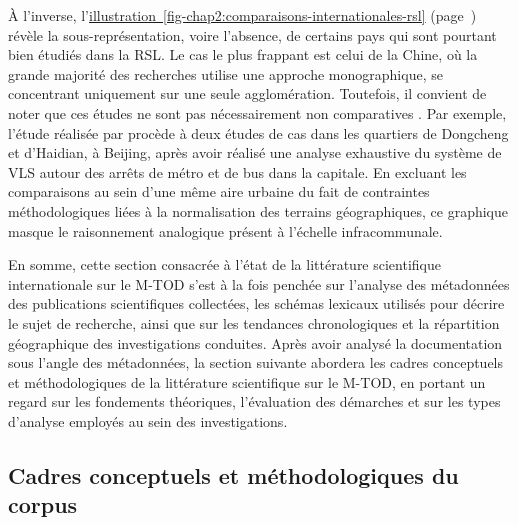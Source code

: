 \begin{refsegment}
À l'inverse, l'\hyperref[fig-chap2:comparaisons-internationales-rsl]{illustration~\ref{fig-chap2:comparaisons-internationales-rsl}} (page~\pageref{fig-chap2:comparaisons-internationales-rsl}) révèle la sous-représentation, voire l'absence, de certains pays qui sont pourtant bien étudiés dans la \acrshort{RSL}. Le cas le plus frappant est celui de la Chine, où la grande majorité des recherches utilise une approche monographique, se concentrant uniquement sur une seule agglomération. Toutefois, il convient de noter que ces études ne sont pas nécessairement non comparatives \textcolor{blue}{\autocite[30-31]{gueranger_monographie_2012}}. Par exemple, l'étude réalisée par \textcolor{blue}{\textcite[77]{liu_solving_2012}} procède à deux études de cas dans les quartiers de Dongcheng et d'Haidian, à Beijing, après avoir réalisé une analyse exhaustive du système de \acrshort{VLS} autour des arrêts de métro et de bus dans la capitale. En excluant les comparaisons au sein d'une même aire urbaine du fait de contraintes méthodologiques liées à la normalisation des terrains géographiques, ce graphique masque le raisonnement analogique présent à l'échelle infracommunale.%

En somme, cette section consacrée à l'état de la littérature scientifique internationale sur le \acrshort{M-TOD} s'est à la fois penchée sur l'analyse des métadonnées des publications scientifiques collectées, les schémas lexicaux utilisés pour décrire le sujet de recherche, ainsi que sur les tendances chronologiques et la répartition géographique des investigations conduites. Après avoir analysé la documentation sous l'angle des métadonnées, la section suivante abordera les cadres conceptuels et méthodologiques de la littérature scientifique sur le \acrshort{M-TOD}, en portant un regard sur les fondements théoriques, l'évaluation des démarches et sur les types d'analyse employés au sein des investigations.%

\subsection{Cadres conceptuels et méthodologiques du corpus
    \label{chap2:cadres-conceptuels-methodologiques}
    }
    

\end{refsegment}
